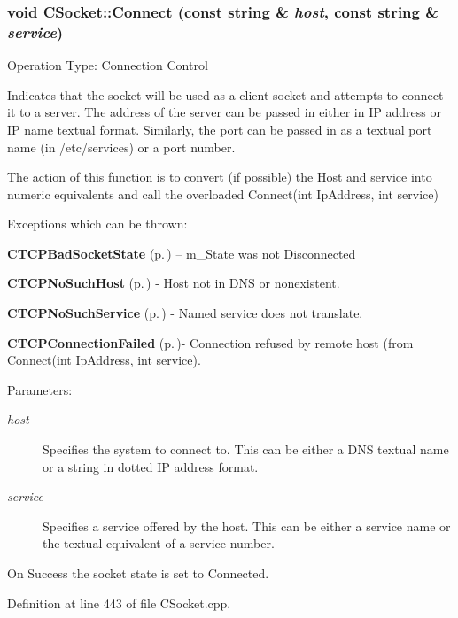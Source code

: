 \subsubsection{\setlength{\rightskip}{0pt plus 5cm}void CSocket::Connect (const string \& {\em host}, const string \& {\em service})}\label{classCSocket_a5}


Operation Type: Connection Control

Indicates that the socket will be used as a client socket and attempts to connect it to a server.  The address of the server can be passed in either in IP address or IP name textual format. Similarly, the port can be passed in as a textual port name (in /etc/services) or a port number.

The action of this function is to convert (if possible) the Host and service  into numeric equivalents and call the overloaded Connect(int Ip\-Address, int service)

Exceptions which can be thrown:

\begin{CompactItemize}
\item 
{\bf CTCPBad\-Socket\-State} {\rm (p.\,\pageref{classCTCPBadSocketState})} -- m\_\-State was not Disconnected\item 
{\bf CTCPNo\-Such\-Host} {\rm (p.\,\pageref{classCTCPNoSuchHost})} - Host not in DNS or nonexistent.\item 
{\bf CTCPNo\-Such\-Service} {\rm (p.\,\pageref{classCTCPNoSuchService})} - Named service does not translate.\item 
{\bf CTCPConnection\-Failed} {\rm (p.\,\pageref{classCTCPConnectionFailed})}- Connection refused by remote host (from Connect(int Ip\-Address, int service).\end{CompactItemize}
\begin{Desc}
\item[Parameters: ]\par
\begin{description}
\item[{\em 
host}]Specifies the system to connect to. This can be either a DNS textual name or a string in dotted IP address format. \item[{\em 
service}]Specifies a service offered by the host. This can be either a service name or the textual equivalent of a service number.\end{description}
\end{Desc}
On Success the socket state is set to Connected. 

Definition at line 443 of file CSocket.cpp.

